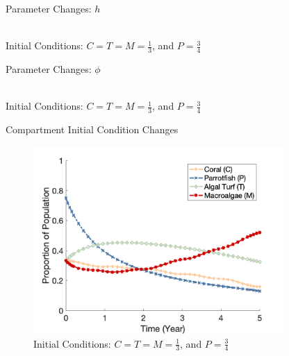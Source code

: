 \documentclass{beamer}
\begin{document}
\begin{frame}{Parameter Changes: $h$}
    \begin{center}
        \\
        Initial Conditions: $C = T = M = \frac{1}{3}$, and $P = \frac{3}{4}$
    \end{center}
\end{frame}


\begin{frame}{Parameter Changes: $\phi$}
    \begin{center}
        \\
        Initial Conditions: $C = T = M = \frac{1}{3}$, and $P = \frac{3}{4}$
    \end{center}
\end{frame}

\begin{frame}{Compartment Initial Condition Changes}
    \begin{figure}
        \centering
        \includegraphics[width=0.85\textwidth]{Latex/Figures/Graphs/0.3C_0.3T_0.3M.png}
        \caption{Initial Conditions: $C = T = M = \frac{1}{3}$, and $P = \frac{3}{4}$}
        \label{fig:initial_plot}
    \end{figure}
\end{frame}
\end{document}
